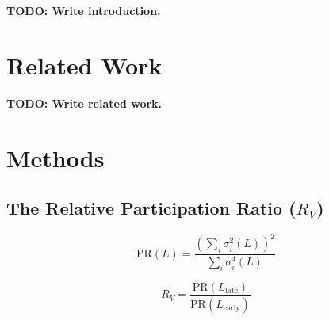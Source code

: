 \documentclass{article}
\newcommand{\RV}{R_V}
\newcommand{\PR}{\text{PR}}
\begin{document}


\textbf{TODO: Write introduction.}



\section{Related Work}


\textbf{TODO: Write related work.}



\section{Methods}

\subsection{The Relative Participation Ratio ($\RV$)}

\begin{equation}
    \PR(L) = \frac{\left(\sum_i \sigma_i^2(L)\right)^2}{\sum_i \sigma_i^4(L)}
\end{equation}

\begin{equation}
    \RV = \frac{\PR(L_{\text{late}})}{\PR(L_{\text{early}})}
    \label{eq:rv}
\end{equation}
\end{document}
